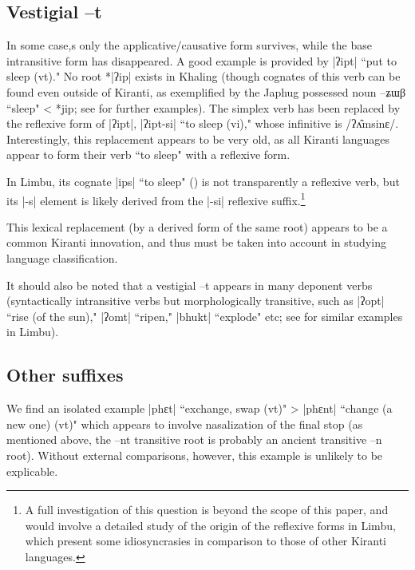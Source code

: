 \documentclass[oldfontcommands,oneside,a4paper,11pt]{article}
\newcommand{\ipa}[1]{{\phon #1}} %
\newcommand{\dhatu}[1]{|\ipa{#1}|}
\begin{document}
\subsection{Vestigial --t}

In some case,s only the applicative/causative form survives, while the base intransitive form has disappeared.  A good example is provided by \dhatu{ʔipt} ``put to sleep (vt)." No root *\dhatu{ʔip} exists in Khaling (though cognates of this verb can be found even outside of Kiranti, as exemplified by the Japhug possessed noun \ipa{--ʑɯβ} ``sleep" < *\ipa{jip}; see \citealt{matisoff03} for further examples). The simplex verb has been replaced by the reflexive form of \dhatu{ʔipt}, \dhatu{ʔipt-si} ``to sleep (vi)," whose infinitive is /\ipa{ʔʌ̂msinɛ}/. Interestingly, this replacement appears to be very old, as all Kiranti languages appear to form their verb ``to sleep" with a reflexive form. 

In Limbu, its cognate \dhatu{ips} ``to sleep" (\citealt{michailovsky02dico}) is not transparently a reflexive verb, but its |-s| element is likely  derived from the |-si| reflexive suffix.\footnote{A full investigation of this question is beyond the scope of this paper, and would involve a detailed study of the origin of the reflexive forms in Limbu, which present some idiosyncrasies in comparison to those of other Kiranti languages.}

This lexical replacement (by a derived form of the same root) appears to be a common Kiranti innovation, and thus must be taken into account in studying language classification.

It should also be noted that a vestigial \ipa{--t} appears in many deponent verbs (syntactically intransitive verbs but morphologically transitive, such as \dhatu{ʔopt} ``rise (of the sun)," \dhatu{ʔomt} ``ripen," \dhatu{bhukt} ``explode" etc; see \citealt{michailovsky97deponent} for similar examples in Limbu).



 \subsection{Other suffixes}
We find an isolated example \dhatu{phɛt} ``exchange, swap (vt)" > \dhatu{phɛnt} ``change (a new one) (vt)" which appears to involve nasalization of the final stop (as mentioned above, the \ipa{--nt} transitive root is probably an ancient transitive \ipa{--n} root). Without external comparisons, however, this example is unlikely to be explicable.
\end{document}
